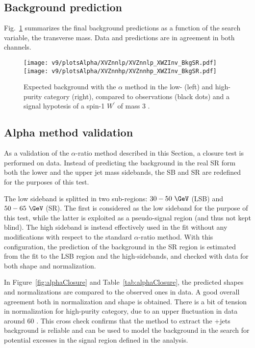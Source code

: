 \clearpage


\subsection{Background prediction}
Fig.~\ref{fig:XVZnn_Exp} summarizes the final background predictions as a function of the search variable, the transverse mass. Data and predictions are in agreement in both channels.

\begin{figure}[!htb]
  \centering
    \texttt{[image: v9/plotsAlpha/XVZnnlp/XVZnnlp\_XWZInv\_BkgSR.pdf]}
    \texttt{[image: v9/plotsAlpha/XVZnnhp/XVZnnhp\_XWZInv\_BkgSR.pdf]}
  \caption{Expected background with the $\alpha$ method in the low- (left) and high-purity category (right), compared to observations (black dots) and a signal hypotesis of a spin-1 $W^{'}$ of mass 3 \TeV.}
  \label{fig:XVZnn_Exp}
\end{figure}

\clearpage

\subsection{Alpha method validation}

As a validation of the $\alpha$-ratio method described in this Section, a closure test is performed on data. Instead of predicting the background in the real \V SR form both the lower and the upper jet mass sidebands, the SB and SR are redefined for the purposes of this test. 

The low sideband is splitted in two sub-regions: $30-50~\GeV$ (LSB) and $50-65~\GeV$ (SR). The first is considered as the low sideband for the purpose of this test, while the latter is exploited as a pseudo-signal region (and thus not kept blind). The high sideband is instead effectively used in the fit without any modifications with respect to the standard $\alpha$-ratio method.
With this configuration, the prediction of the background in the SR region is estimated from the fit to the LSB region and the high-sidebands, and checked with data for both shape and normalization.

In Figure~\ref{fig:alphaClosure} and Table~\ref{tab:alphaClosure}, the predicted shapes and normalizations are compared to the observed ones in data. 
A good overall agreement both in normalization and shape is obtained. There is a bit of tension in normalization for high-purity category, due to an upper fluctuation in data around 60 \GeV.
This cross check confirms that the method to extract the \V+jets background is reliable and can be used to model the background in the search for potential excesses in the signal region defined in the analysis.

